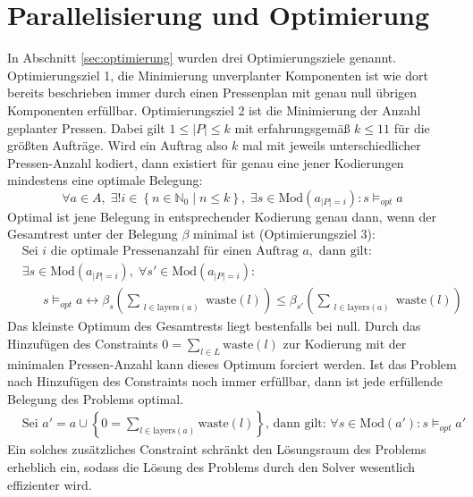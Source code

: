 \section{Parallelisierung und Optimierung}
\label{sec:parallelisierung}
In Abschnitt \ref{sec:optimierung} wurden drei Optimierungsziele genannt.
Optimierungsziel 1, die Minimierung unverplanter Komponenten ist wie dort bereits beschrieben immer durch einen Pressenplan mit genau null übrigen Komponenten erfüllbar.
Optimierungsziel 2 ist die Minimierung der Anzahl geplanter Pressen.
Dabei gilt $1 \leq \lvert P \rvert \leq k$ mit erfahrungsgemäß $k \leq 11$ für die größten Aufträge.
Wird ein Auftrag also $k$ mal mit jeweils unterschiedlicher Pressen-Anzahl kodiert, dann existiert für genau eine jener Kodierungen mindestens eine optimale Belegung:
\[
    \forall a \in A, \; \exists! i \in \left\{ n \in \mathbb{N}_0 \mid n \leq k \right\}, \; \exists s \in \text{Mod}(a_{\lvert P \rvert = i}): s \models_{opt} a
\]
Optimal ist jene Belegung in entsprechender Kodierung genau dann, wenn der Gesamtrest unter der Belegung $\beta$ minimal ist (Optimierungsziel 3):
\begin{align*}
    &\hspace{0pt} \text{Sei } i \text{ die optimale Pressenanzahl für einen Auftrag } a, \text{ dann gilt:} \\
    &\hspace{0pt} \exists s \in \text{Mod}(a_{\lvert P \rvert = i}), \; \forall s\prime \in \text{Mod}(a_{\lvert P \rvert = i}): \\
    &\hspace{20pt} s \models_{opt} a \leftrightarrow \beta_{s}\left(\sum\limits_{\substack{l \in \text{layers}(a)}} \text{waste}(l)\right) \leq \beta_{s\prime}\left( \sum\limits_{\substack{l \in \text{layers}(a)}} \text{waste}(l) \right)
\end{align*}
Das kleinste Optimum des Gesamtrests liegt bestenfalls bei null.
Durch das Hinzufügen des Constraints $0 = \sum_{l \in L} \text{waste}(l)$ zur Kodierung mit der minimalen Pressen-Anzahl
kann dieses Optimum forciert werden.
Ist das Problem nach Hinzufügen des Constraints noch immer erfüllbar, dann ist jede erfüllende Belegung des Problems optimal.
\begin{align*}
    &\hspace{0pt} \text{Sei } a\prime = a \cup \left\{0 = \sum_{l \in \text{layers}(a)} \text{waste}(l)\right\} \text{, dann gilt: }
    \forall s \in \text{Mod}(a\prime): s \models_{opt} a\prime
\end{align*}
Ein solches zusätzliches Constraint schränkt den Lösungsraum des Problems erheblich ein, sodass die Lösung des Problems durch den Solver wesentlich effizienter wird.

